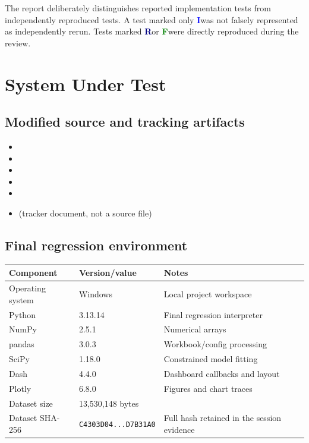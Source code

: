 \documentclass[11pt]{article}
\newcommand{\IR}{\textcolor{blue}{\textbf{I}}}
\newcommand{\RR}{\textcolor{navy}{\textbf{R}}}
\newcommand{\FR}{\textcolor{green}{\textbf{F}}}
\begin{document}
The report deliberately distinguishes reported implementation tests from independently reproduced tests. A test marked only \IR was not falsely represented as independently rerun. Tests marked \RR or \FR were directly reproduced during the review.

\section{System Under Test}

\subsection{Modified source and tracking artifacts}

\begin{itemize}
  \item {}
  \item {}
  \item {}
  \item {}
  \item {}
  \item {} (tracker document, not a source file)
\end{itemize}

\subsection{Final regression environment}

\begin{center}
\begin{tabular}{L{4.2cm}L{4.1cm}L{6.6cm}}
\toprule
\textbf{Component} & \textbf{Version/value} & \textbf{Notes}\\
\midrule
Operating system & Windows & Local project workspace\\
Python & 3.13.14 & Final regression interpreter\\
NumPy & 2.5.1 & Numerical arrays\\
pandas & 3.0.3 & Workbook/config processing\\
SciPy & 1.18.0 & Constrained model fitting\\
Dash & 4.4.0 & Dashboard callbacks and layout\\
Plotly & 6.8.0 & Figures and chart traces\\
Dataset size & 13,530,148 bytes & \\
Dataset SHA-256 & \texttt{C4303D04...D7B31A0} & Full hash retained in the session evidence\\
\bottomrule
\end{tabular}
\end{center}
\end{document}
